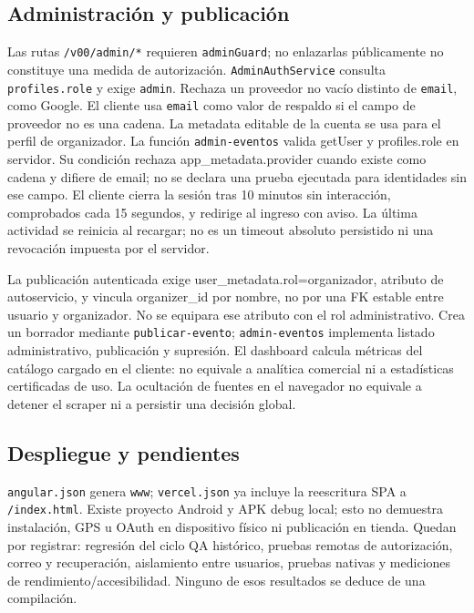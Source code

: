 \subsection{Administración y publicación}
Las rutas \texttt{/v00/admin/*} requieren \texttt{adminGuard}; no enlazarlas públicamente
no constituye una medida de autorización. \texttt{AdminAuthService} consulta
\texttt{profiles.role} y exige \texttt{admin}. Rechaza un proveedor no vacío
distinto de \texttt{email}, como Google. El cliente usa \texttt{email} como
valor de respaldo si el campo de proveedor no es una cadena. La metadata
editable de la cuenta se usa para el perfil de organizador.
La función \texttt{admin-eventos} valida getUser y profiles.role en servidor.
Su condición rechaza app\_metadata.provider cuando existe como cadena y difiere de email;
no se declara una prueba ejecutada para identidades sin ese campo.
El cliente cierra la sesión tras 10 minutos sin interacción, comprobados cada 15 segundos,
y redirige al ingreso con aviso. La última actividad se reinicia al recargar; no es un
timeout absoluto persistido ni una revocación impuesta por el servidor.

La publicación autenticada exige user\_metadata.rol=organizador, atributo de autoservicio,
y vincula organizer\_id por nombre, no por una FK estable entre usuario y organizador.
No se equipara ese atributo con el rol administrativo. Crea un borrador mediante \texttt{publicar-evento};
\texttt{admin-eventos} implementa listado administrativo, publicación y supresión.
El dashboard calcula métricas del catálogo cargado en el cliente: no equivale a analítica
comercial ni a estadísticas certificadas de uso. La ocultación de fuentes en el navegador
no equivale a detener el scraper ni a persistir una decisión global.

\subsection{Despliegue y pendientes}
\texttt{angular.json} genera \texttt{www}; \texttt{vercel.json} ya incluye la reescritura
SPA a \texttt{/index.html}. Existe proyecto Android y APK debug local; esto no demuestra
instalación, GPS u OAuth en dispositivo físico ni publicación en tienda.
Quedan por registrar: regresión del ciclo QA histórico, pruebas remotas de autorización,
correo y recuperación, aislamiento entre usuarios, pruebas nativas y mediciones de
rendimiento/accesibilidad. Ninguno de esos resultados se deduce de una compilación.
